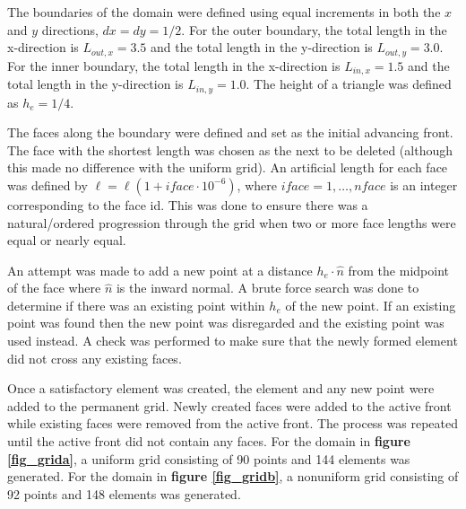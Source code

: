 \documentclass[11pt]{article}
\begin{document}
The boundaries of the domain were defined using equal increments in both the $x$ and $y$ directions, $dx = dy = 1/2$.  For the outer boundary, the total length in the x-direction is $L_{out,x} = 3.5$ and the total length in the y-direction is $L_{out,y}=3.0$.  For the inner boundary, the total length in the x-direction is $L_{in,x} = 1.5$ and the total length in the y-direction is $L_{in,y}=1.0$.  The height of a triangle was defined as $h_e = 1/4$.  

The faces along the boundary were defined and set as the initial advancing front.  The face with the shortest length was chosen as the next to be deleted (although this made no difference with the uniform grid).  An artificial length for each face was defined by $\ell = \ell \left( 1 + iface \cdot 10^{-6}\right)$, where $iface = 1,\hdots,nface$ is an integer corresponding to the face id.  This was done to ensure there was a natural/ordered progression through the grid when two or more face lengths were equal or nearly equal. 

An attempt was made to add a new point at a distance $h_e \cdot \hat{n}$ from the midpoint of the face where $\hat{n}$ is the inward normal.  A brute force search was done to determine if there was an existing point within $h_e$ of the new point.  If an existing point was found then the new point was disregarded and the existing point was used instead.  A check was performed to make sure that the newly formed element did not cross any existing faces.

Once a satisfactory element was created, the element and any new point were added to the permanent grid.  Newly created faces were added to the active front while existing faces were removed from the active front.  The process was repeated until the active front did not contain any faces.  For the domain in \textbf{figure \ref{fig_grida}}, a uniform grid consisting of 90 points and 144 elements was generated.  For the domain in \textbf{figure \ref{fig_gridb}}, a nonuniform grid consisting of 92 points and 148 elements was generated. 
\end{document}
